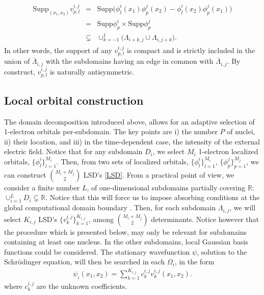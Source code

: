 \documentclass[11pt]{elsarticle}
\newcommand{\R} {\ensuremath{\mathbb{R}}}
\begin{document}
\begin{eqnarray}\label{supp}
\left.
\begin{array}{lcl} 
\mbox{Supp}_{(x_1,x_2)} v^{i,j}_{p,l} & = &\mbox{Supp}\Big(\phi_l^i(x_1)\phi_p^j(x_2) -\phi_l^i(x_2)\phi_p^j(x_1)\Big)\\
&=& \mbox{Supp}\phi_p^i\times\mbox{Supp}\phi_p^j\\
&\subsetneq &\cup_{k=-1}^1\Big(\Lambda_{i+k,j}\cup\Lambda_{i,j+k}\Big).
\end{array}
\right.
\end{eqnarray}
In other words, the support of any $v^{i,j}_{p,l}$ is compact and is strictly included in the union of $\overline{\Lambda}_{i,j}$ with the subdomains having an edge in common with $\overline{\Lambda}_{i,j}$. By construct, $v^{i,j}_{p,l}$ is naturally antisymmetric.
\subsection{Local orbital construction}\label{subsec:SLO}
The domain decomposition introduced above, allows for an adaptive selection of 1-electron orbitals per-subdomain. The key points are i) the number $P$ of nuclei, ii) their location, and iii) in the time-dependent case, the intensity of the external electric field. Notice that for any subdomain $D_i$, we select $M_i$ 1-electron localized orbitals, $\big\{\phi_l^i\big\}_{l=1}^{M_i}$. Then, from two sets of localized orbitals, $\big\{\phi_l^i\big\}_{l=1}^{M_i}$, $\big\{\phi_p^j\big\}_{p=1}^{M_j}$, we can construct ${M_i+M_j \choose 2}$ LSD's \eqref{LSD}. From a practical point of view, we consider a finite number $L$, of one-dimensional subdomains partially covering $\R$: $\cup_{i=1}^LD_{i} \subsetneq \R$. Notice that this will force us to impose absorbing conditions at the global computational domain boundary \cite{ABC,MOLPHYS}. Then, for each subdomain $\Lambda_{i,j}$, we will select $K_{i,j}$ LSD's $\big\{v_{k}^{i,j}\big\}_{k=1}^{K_{i,j}}$, among ${M_i+M_j \choose 2}$ determinants. Notice however that the procedure which is presented below, may only be relevant for subdomains containing at least one nucleus. In the other subdomains, local Gaussian basis functions could be considered. The stationary wavefunction $\psi$, solution to the Schr\"odinger equation, will then be searched in each $\Omega_i$, in the form 
\begin{eqnarray*}
\psi_i(x_1,x_2) = \sum_{k=1}^{K_{i,j}}c_{k}^{i,j}v_{k}^{i,j}(x_1,x_2).
\end{eqnarray*}
where $c_{k}^{i,j}$ are the unknown coefficients. 
\end{document}
